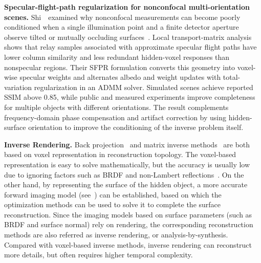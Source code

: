 \vspace{0.8mm}
\noindent \textbf{Specular-flight-path regularization for nonconfocal multi-orientation scenes.}
Shi~\etal~examined why nonconfocal measurements can become poorly conditioned when a single illumination point and a finite detector aperture observe tilted or mutually occluding surfaces~\cite{shiSpecularFlightPathNLOS2026}. Local transport-matrix analysis shows that relay samples associated with approximate specular flight paths have lower column similarity and less redundant hidden-voxel responses than nonspecular regions. Their SFPR formulation converts this geometry into voxel-wise specular weights and alternates albedo and weight updates with total-variation regularization in an ADMM solver. Simulated scenes achieve reported SSIM above 0.85, while public and measured experiments improve completeness for multiple objects with different orientations. The result complements frequency-domain phase compensation and artifact correction by using hidden-surface orientation to improve the conditioning of the inverse problem itself.

\vspace{0.8mm}
\noindent \textbf{Inverse Rendering.}
Back projection~\cite{mannaErrorBackprojectionAlgorithms2018,veltenRecoveringThreedimensionalShape2012} and matrix inverse methods~\cite{heideDiffuseMirrors3D2014,otooleConfocalNonlineofsightImaging2018} are both based on voxel representation in reconstruction topology. The voxel-based representation is easy to solve mathematically, but the accuracy is usually low due to ignoring factors such as BRDF and non-Lambert reflections~\cite{tsaiVolumetricAlbedoSurface2019}. On the other hand, by representing the surface of the hidden object, a more accurate forward imaging model (see~\cite{tsaiVolumetricAlbedoSurface2019}) can be established, based on which the optimization methods can be used to solve it to complete the surface reconstruction. Since the imaging models based on surface parameters (such as BRDF and surface normal) rely on rendering, the corresponding reconstruction methods are also referred as inverse rendering, or analysis-by-synthesis. Compared with voxel-based inverse methods, inverse rendering can reconstruct more details, but often requires higher temporal complexity\cite{Young:2020:dlct,heideNonlineofsightImagingPartial2017}.


